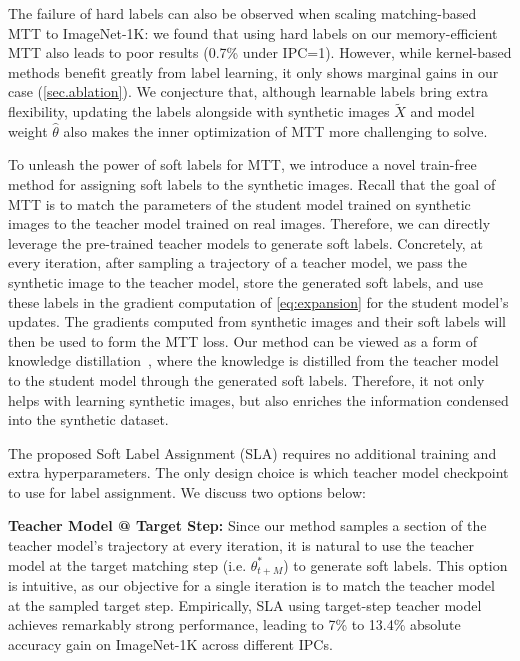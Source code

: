\documentclass[10pt,twocolumn,letterpaper]{article}
\begin{document}
The failure of hard labels can also be observed when scaling matching-based MTT to ImageNet-1K: we found that using hard labels on our memory-efficient MTT also leads to poor results (0.7\% under IPC=1).
However, while kernel-based methods benefit greatly from label learning, it only shows marginal gains in our case (\cref{sec.ablation}).
We conjecture that, although learnable labels bring extra flexibility, updating the labels alongside with synthetic images $\tilde{X}$ and model weight $\hat\theta$ also makes the inner optimization of MTT more challenging to solve.

To unleash the power of soft labels for MTT, we introduce a novel train-free method for assigning soft labels to the synthetic images.
Recall that the goal of MTT is to match the parameters of the student model trained on synthetic images to the teacher model trained on real images.
Therefore, we can directly leverage the pre-trained teacher models to generate soft labels.
Concretely, at every iteration, after sampling a trajectory of a teacher model, we pass the synthetic image to the teacher model, store the generated soft labels, and use these labels in the gradient computation of \cref{eq:expansion} for the student model's updates. 
The gradients computed from synthetic images and their soft labels will then be used to form the MTT loss.
Our method can be viewed as a form of knowledge distillation~\cite{hinton2015distilling}, where the knowledge is distilled from the teacher model to the student model through the generated soft labels.
Therefore, it not only helps with learning synthetic images, but also enriches the information condensed into the synthetic dataset.

The proposed Soft Label Assignment (SLA) requires no additional training and extra hyperparameters.
The only design choice is which teacher model checkpoint to use for label assignment.
We discuss two options below:

\textbf{Teacher Model @ Target Step:} Since our method samples a section of the teacher model's trajectory at every iteration, it is natural to use the teacher model at the target matching step (i.e. $\theta_{t+M}^*$) to generate soft labels.
This option is intuitive, as our objective for a single iteration is to match the teacher model at the sampled target step.
Empirically, SLA using target-step teacher model achieves remarkably strong performance, leading to 7\% to 13.4\% absolute accuracy gain on ImageNet-1K across different IPCs.
\end{document}
